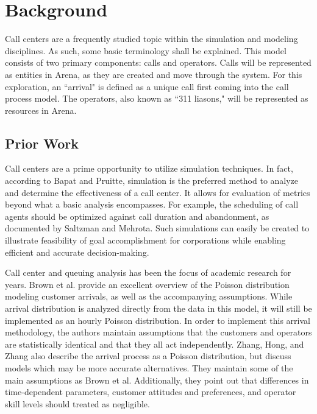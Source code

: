 \documentclass[12pt,twocolumn]{article}
\begin{document}
\section{Background}
Call centers are a frequently studied topic within the simulation and modeling disciplines.  As such, some basic terminology shall be explained.  This model consists of two primary components:  calls and operators.  Calls will be represented as entities in Arena, as they are created and move through the system.  For this exploration, an ``arrival" is defined as a unique call first coming into the call process model.  The operators, also known as ``311 liasons," will be represented as resources in Arena.

	\subsection{Prior Work}

Call centers are a prime opportunity to utilize simulation techniques.  In fact, according to Bapat and Pruitte, simulation is the preferred method to analyze and determine the effectiveness of a call center.\cite{bapat}  It allows for evaluation of metrics beyond what a basic analysis encompasses.  For example, the scheduling of call agents should be optimized against call duration and abandonment, as documented by Saltzman and Mehrota\cite{saltzman}.  Such simulations can easily be created to illustrate feasibility of goal accomplishment for corporations while enabling efficient and accurate decision-making\cite{saltzmeh}.

\par


Call center and queuing analysis has been the focus of academic research for years.  Brown et al. provide an excellent overview of the Poisson distribution modeling customer arrivals, as well as the accompanying assumptions\cite{brown}.  While arrival distribution is analyzed directly from the data in this model, it will still be implemented as an hourly Poisson distribution. In order to implement this arrival methodology, the authors maintain assumptions that the customers and operators are statistically identical and that they all act independently.  Zhang, Hong, and Zhang also describe the arrival process as a Poisson distribution, but discuss models which may be more accurate alternatives\cite{zhang}.  They maintain some of the main assumptions as Brown et al.  Additionally, they point out that differences in time-dependent parameters, customer attitudes and preferences, and operator skill levels should treated as negligible.
\end{document}
